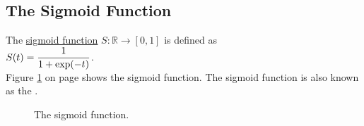 \subsection{The Sigmoid Function}
\begin{Definition}
The \href{https://en.wikipedia.org/wiki/Sigmoid_function}{sigmoid function} $S: \mathbb{R} \rightarrow [0, 1]$ is defined as 
\\[0.2cm]
\hspace*{1.3cm}
$\displaystyle S(t) = \frac{1}{1 + \exp(-t)}$.  
\\[0.2cm]
Figure \ref{fig:sigmoid.eps} on page \pageref{fig:sigmoid.eps} shows the sigmoid function.
The sigmoid function is also known as the .
\eox
\end{Definition}

\begin{figure}[!ht]
\centering
{}
\vspace*{-0.3cm}
\caption{The sigmoid function.}
\label{fig:sigmoid.eps}
\end{figure}


